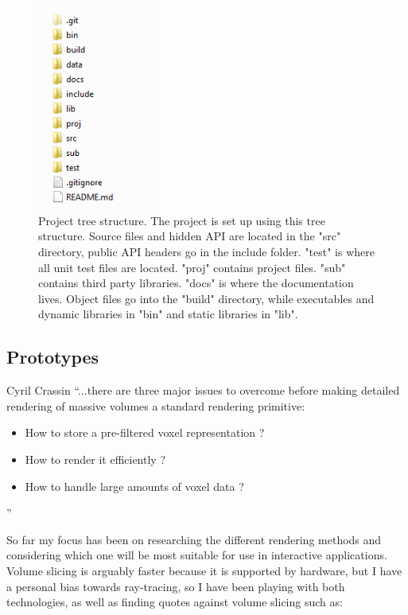 \documentclass[11pt,fleqn,twoside]{article}
\begin{document}
\begin{figure}
\centering
\includegraphics[width=0.35\textwidth]{project-structure}
\caption{Project tree structure. The project is set up using this 
tree structure. Source files and hidden API are located in the "src" directory,
public API headers go in the include folder. "test" is where all unit test files are located. "proj" contains project files. "sub" contains third party libraries. "docs" is where the documentation lives. Object files go into the "build" directory, while executables and dynamic libraries in "bin" and static libraries in "lib".
}
\label{fig:projectSetup}
\end{figure}


\FloatBarrier
\subsection{Prototypes}

\begin{aquote}{Cyril Crassin\cite{CCrassinThesis}}
	``...there are three major issues to overcome before making detailed rendering of massive volumes
	a standard rendering primitive:
	\begin{itemize}
		\item How to store a pre-filtered voxel representation ?
		\item How to render it efficiently ?
		\item How to handle large amounts of voxel data ?
	\end{itemize}''
\end{aquote}

So far my focus has been on researching the different rendering methods and considering which one will be most suitable for use in interactive applications. Volume slicing is arguably faster\cite{AlgorithmComparison} because it is supported by hardware, but I have a personal bias towards ray-tracing, so I have been playing with both technologies, as well as finding quotes against volume slicing such as:
\end{document}
